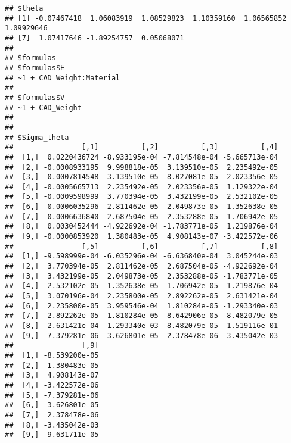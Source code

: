 \documentclass[]{article}
\begin{document}
\begin{verbatim}
## $theta
## [1] -0.07467418  1.06083919  1.08529823  1.10359160  1.06565852  1.09929646
## [7]  1.07417646 -1.89254757  0.05068071
## 
## $formulas
## $formulas$E
## ~1 + CAD_Weight:Material
## 
## $formulas$V
## ~1 + CAD_Weight
## 
## 
## $Sigma_theta
##                [,1]          [,2]          [,3]          [,4]
##  [1,]  0.0220436724 -8.933195e-04 -7.814548e-04 -5.665713e-04
##  [2,] -0.0008933195  9.998818e-05  3.139510e-05  2.235492e-05
##  [3,] -0.0007814548  3.139510e-05  8.027081e-05  2.023356e-05
##  [4,] -0.0005665713  2.235492e-05  2.023356e-05  1.129322e-04
##  [5,] -0.0009598999  3.770394e-05  3.432199e-05  2.532102e-05
##  [6,] -0.0006035296  2.811462e-05  2.049873e-05  1.352638e-05
##  [7,] -0.0006636840  2.687504e-05  2.353288e-05  1.706942e-05
##  [8,]  0.0030452444 -4.922692e-04 -1.783771e-05  1.219876e-04
##  [9,] -0.0000853920  1.380483e-05  4.908143e-07 -3.422572e-06
##                [,5]          [,6]          [,7]          [,8]
##  [1,] -9.598999e-04 -6.035296e-04 -6.636840e-04  3.045244e-03
##  [2,]  3.770394e-05  2.811462e-05  2.687504e-05 -4.922692e-04
##  [3,]  3.432199e-05  2.049873e-05  2.353288e-05 -1.783771e-05
##  [4,]  2.532102e-05  1.352638e-05  1.706942e-05  1.219876e-04
##  [5,]  3.070196e-04  2.235800e-05  2.892262e-05  2.631421e-04
##  [6,]  2.235800e-05  3.959546e-04  1.810284e-05 -1.293340e-03
##  [7,]  2.892262e-05  1.810284e-05  8.642906e-05 -8.482079e-05
##  [8,]  2.631421e-04 -1.293340e-03 -8.482079e-05  1.519116e-01
##  [9,] -7.379281e-06  3.626801e-05  2.378478e-06 -3.435042e-03
##                [,9]
##  [1,] -8.539200e-05
##  [2,]  1.380483e-05
##  [3,]  4.908143e-07
##  [4,] -3.422572e-06
##  [5,] -7.379281e-06
##  [6,]  3.626801e-05
##  [7,]  2.378478e-06
##  [8,] -3.435042e-03
##  [9,]  9.631711e-05
\end{verbatim}
\end{document}
